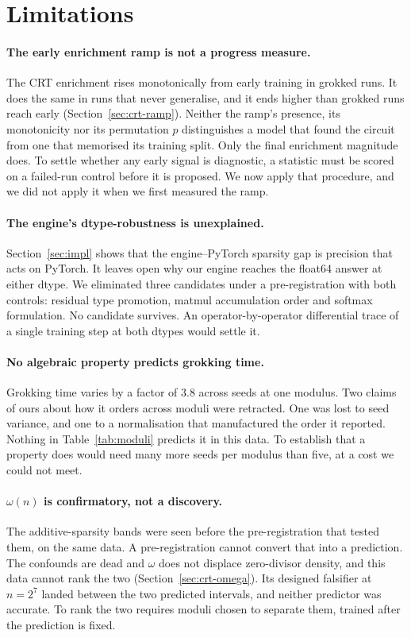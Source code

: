 \section{Limitations}
\label{sec:limits}

\paragraph{The early enrichment ramp is not a progress measure.} The CRT enrichment rises
monotonically from early training in grokked runs. It does the same in runs that never
generalise, and it ends higher than grokked runs reach early (Section~\ref{sec:crt-ramp}).
Neither the ramp's presence, its monotonicity nor its permutation $p$ distinguishes a model
that found the circuit from one that memorised its training split. Only the final enrichment
magnitude does. To settle whether any early signal is diagnostic, a statistic must be scored on
a failed-run control before it is proposed. We now apply that procedure, and we did not apply
it when we first measured the ramp.

\paragraph{The engine's dtype-robustness is unexplained.} Section~\ref{sec:impl} shows that
the engine--PyTorch sparsity gap is precision that acts on PyTorch. It leaves open why our
engine reaches the float64 answer at either dtype. We eliminated three candidates under a
pre-registration with both controls: residual type promotion, matmul accumulation order and
softmax formulation. No candidate survives. An operator-by-operator differential trace of a
single training step at both dtypes would settle it.

\paragraph{No algebraic property predicts grokking time.} Grokking time varies by a factor of
$3.8$ across seeds at one modulus. Two claims of ours about how it orders across moduli were
retracted. One was lost to seed variance, and one to a normalisation that manufactured the order
it reported. Nothing in Table~\ref{tab:moduli} predicts it in this data. To establish
that a property does would need many more seeds per modulus than five, at a cost we could
not meet.

\paragraph{$\omega(n)$ is confirmatory, not a discovery.} The additive-sparsity bands were seen
before the pre-registration that tested them, on the same data. A pre-registration cannot
convert that into a prediction. The confounds are dead and $\omega$ does not displace
zero-divisor density, and this data cannot rank the two (Section~\ref{sec:crt-omega}). Its
designed falsifier at $n = 2^{7}$ landed between the two predicted intervals, and neither
predictor was accurate. To rank the two requires moduli chosen to separate them, trained
after the prediction is fixed.


